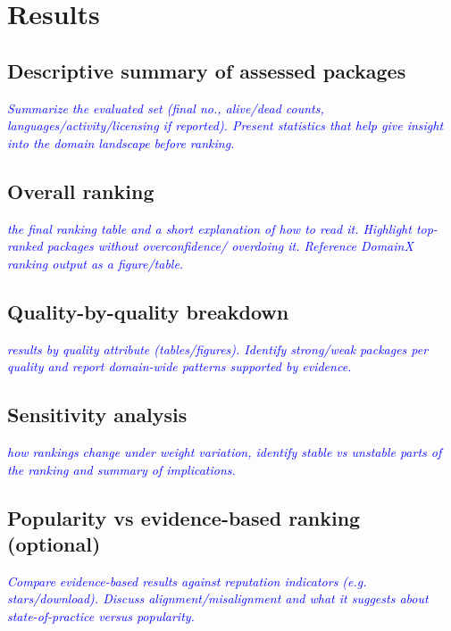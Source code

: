 \documentclass[final,1p,times,authoryear,12pt]{elsarticle}
\providecommand{\wss}[1]{\textcolor{blue}{\textit{#1}}}
\begin{document}
\section{Results}\label{results}

\subsection{Descriptive summary of assessed packages}\label{results-summary}
\wss{Summarize the evaluated set (final no., alive/dead counts, languages/activity/licensing if reported). 
Present  statistics that help give insight into the domain landscape before ranking.}

\subsection{Overall ranking}\label{results-ranking}
\wss{ the final ranking table and a short explanation of how to read it. 
Highlight  top-ranked packages without overconfidence/ overdoing it. Reference DomainX ranking output as a figure/table.}

\subsection{Quality-by-quality breakdown}\label{results-byquality}
\wss{ results by quality attribute (tables/figures). Identify strong/weak packages per quality and report domain-wide patterns
 supported by evidence.}

\subsection{Sensitivity analysis}\label{results-sensitivity}
\wss{ how rankings change under weight variation, identify stable vs unstable parts of the ranking and summary of implications.}

\subsection{Popularity vs evidence-based ranking (optional)}\label{results-popularity}
\wss{Compare evidence-based results against reputation indicators (e.g. stars/download). Discuss alignment/misalignment
 and what it suggests about state-of-practice versus  popularity.}

\end{document}
